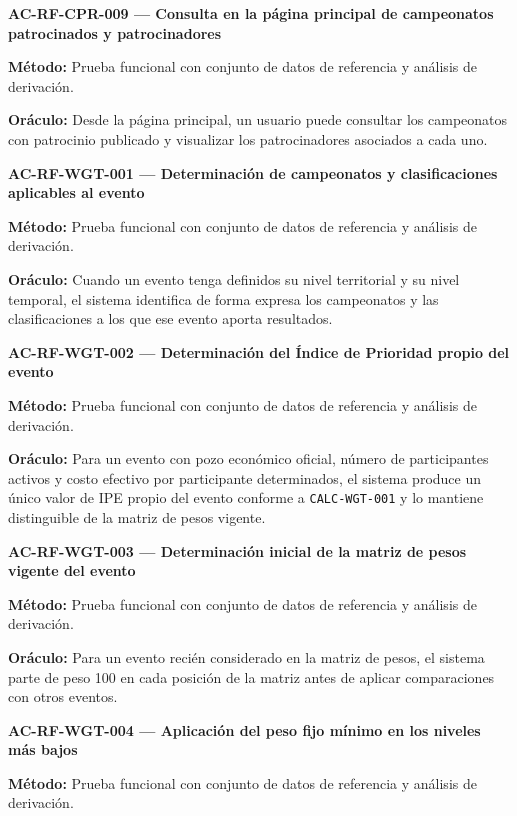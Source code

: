 \documentclass[10pt,letterpaper]{article}
\begin{document}
\noindent\textbf{AC-RF-CPR-009 --- Consulta en la página principal de campeonatos patrocinados y patrocinadores}\par
\textbf{Método:} Prueba funcional con conjunto de datos de referencia y análisis de derivación.\par
\textbf{Oráculo:} Desde la página principal, un usuario puede consultar los campeonatos con patrocinio publicado y visualizar los patrocinadores asociados a cada uno.\par\vspace{0.45em}
\noindent\textbf{AC-RF-WGT-001 --- Determinación de campeonatos y clasificaciones aplicables al evento}\par
\textbf{Método:} Prueba funcional con conjunto de datos de referencia y análisis de derivación.\par
\textbf{Oráculo:} Cuando un evento tenga definidos su nivel territorial y su nivel temporal, el sistema identifica de forma expresa los campeonatos y las clasificaciones a los que ese evento aporta resultados.\par\vspace{0.45em}
\noindent\textbf{AC-RF-WGT-002 --- Determinación del Índice de Prioridad propio del evento}\par
\textbf{Método:} Prueba funcional con conjunto de datos de referencia y análisis de derivación.\par
\textbf{Oráculo:} Para un evento con pozo económico oficial, número de participantes activos y costo efectivo por participante determinados, el sistema produce un único valor de IPE propio del evento conforme a \texttt{CALC-WGT-001} y lo mantiene distinguible de la matriz de pesos vigente.\par\vspace{0.45em}
\noindent\textbf{AC-RF-WGT-003 --- Determinación inicial de la matriz de pesos vigente del evento}\par
\textbf{Método:} Prueba funcional con conjunto de datos de referencia y análisis de derivación.\par
\textbf{Oráculo:} Para un evento recién considerado en la matriz de pesos, el sistema parte de peso 100 en cada posición de la matriz antes de aplicar comparaciones con otros eventos.\par\vspace{0.45em}
\noindent\textbf{AC-RF-WGT-004 --- Aplicación del peso fijo mínimo en los niveles más bajos}\par
\textbf{Método:} Prueba funcional con conjunto de datos de referencia y análisis de derivación.\par
\end{document}
